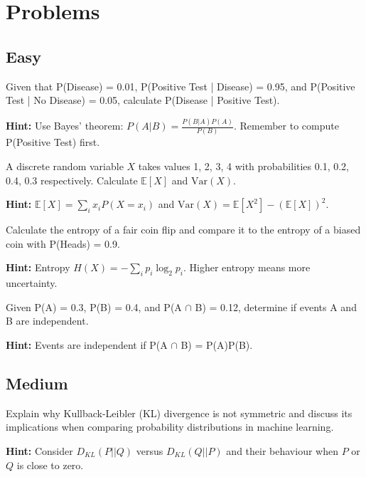 
\section*{Problems}

\subsection*{Easy}

\begin{problem}
Given that P(Disease) = 0.01, P(Positive Test | Disease) = 0.95, and P(Positive Test | No Disease) = 0.05, calculate P(Disease | Positive Test).

\textbf{Hint:} Use Bayes' theorem: $P(A|B) = \frac{P(B|A)P(A)}{P(B)}$. Remember to compute P(Positive Test) first.
\end{problem}

\begin{problem}
A discrete random variable $X$ takes values 1, 2, 3, 4 with probabilities 0.1, 0.2, 0.4, 0.3 respectively. Calculate $\mathbb{E}[X]$ and $\text{Var}(X)$.

\textbf{Hint:} $\mathbb{E}[X] = \sum_i x_i P(X=x_i)$ and $\text{Var}(X) = \mathbb{E}[X^2] - (\mathbb{E}[X])^2$.
\end{problem}

\begin{problem}
Calculate the entropy of a fair coin flip and compare it to the entropy of a biased coin with P(Heads) = 0.9.

\textbf{Hint:} Entropy $H(X) = -\sum_i p_i \log_2 p_i$. Higher entropy means more uncertainty.
\end{problem}

\begin{problem}
Given P(A) = 0.3, P(B) = 0.4, and P(A $\cap$ B) = 0.12, determine if events A and B are independent.

\textbf{Hint:} Events are independent if P(A $\cap$ B) = P(A)P(B).
\end{problem}

\subsection*{Medium}

\begin{problem}
Explain why Kullback-Leibler (KL) divergence is not symmetric and discuss its implications when comparing probability distributions in machine learning.

\textbf{Hint:} Consider $D_{KL}(P||Q)$ versus $D_{KL}(Q||P)$ and their behaviour when $P$ or $Q$ is close to zero.
\end{problem}


